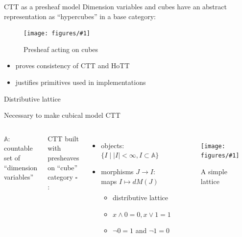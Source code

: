 \documentclass[english,draft]{beamer}
\newcommand{\fig}[2]{
    \begin{figure}\begin{center}\texttt{[image: figures/\#1]}\caption{#2\label{#1}}\end{center}
    \end{figure}}
\begin{document}
\begin{frame}{CTT as a presheaf model}
    Dimension variables and cubes have an abstract representation as ``hypercubes'' in a base category:
    
    \fig{cube_presheaf}{Presheaf acting on cubes}

    \begin{itemize}
        \item proves consistency of CTT and HoTT
        \item justifies primitives used in implementations
    \end{itemize}
    
\end{frame}

\begin{frame}{Distributive lattice}

%  
%  
 Necessary to make cubical model CTT

  \begin{columns}[c]
        $\mathbb{A}$: countable set of ``dimension variables'' 

        CTT built with presheaves on ``cube'' category $\square$: 
        \begin{itemize}
            \item objects: $\{ I \mid |I| < \infty , I \subset \mathbb{A} \}$
            \item morphisms $J\rightarrow I$: maps $I \mapsto dM(J)$
            \begin{itemize}
                \item distributive lattice
                \item  $x \wedge 0 = 0, x\vee 1 = 1$
                \item $\neg 0 = 1$ and $ \neg 1 =0$
            \end{itemize}
        \end{itemize}

        \fig{lattice}{A simple lattice}
\end{columns}
 
 
\end{frame}
\end{document}

